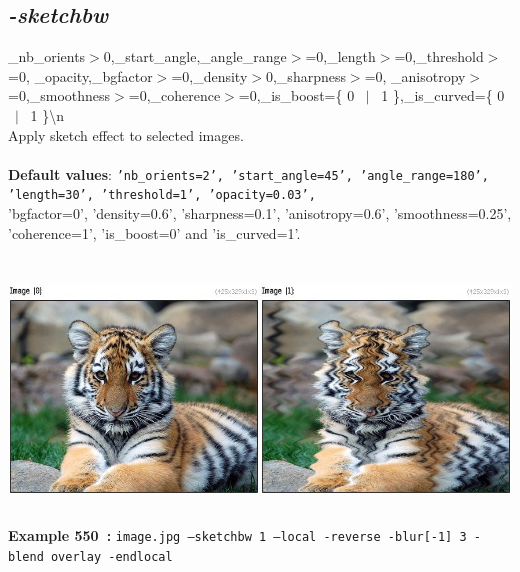 \documentclass[a4paper,11pt,twoside]{book}
\begin{document}
\subsection{\emph{-sketchbw} }\vspace*{-0.5em}
\_nb\_orients$>$0,\_start\_angle,\_angle\_range$>$=0,\_length$>$=0,\_threshold$>$=0,
\_opacity,\_bgfactor$>$=0,\_density$>$0,\_sharpness$>$=0,
\_anisotropy$>$=0,\_smoothness$>$=0,\_coherence$>$=0,\_is\_boost=\{ 0 ~$|$~ 1 \},\_is\_curved=\{ 0 ~$|$~ 1 \}\textbackslash n
~\\Apply sketch effect to selected images.
~\\~\\\textbf{Default values}: {\small \texttt{'nb\_orients=2', 'start\_angle=45', 'angle\_range=180', 'length=30', 'threshold=1', 'opacity=0.03',}}
~\\'bgfactor=0', 'density=0.6', 'sharpness=0.1', 'anisotropy=0.6', 'smoothness=0.25', 'coherence=1', 'is\_boost=0' and 'is\_curved=1'.
\begin{center}\includegraphics[keepaspectratio=true,height=7cm,width=\textwidth]{img/gmic_def550.jpg}\\
{\footnotesize \textbf{Example 550~:} \texttt{image.jpg --sketchbw 1 --local -reverse -blur[-1] 3 -blend overlay -endlocal}}
\end{center}
\end{document}
